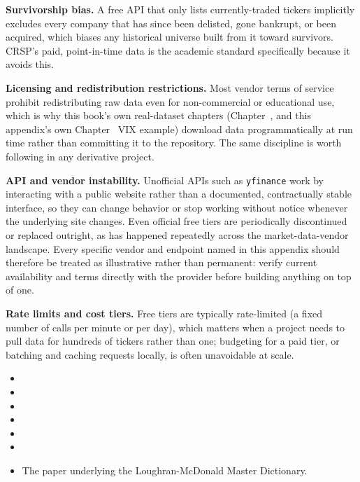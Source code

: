 \documentclass[../ai_in_finance]{subfiles}
\begin{document}
\textbf{Survivorship bias.} A free API that only lists currently-traded tickers implicitly excludes every company that has since been delisted, gone bankrupt, or been acquired, which biases any historical universe built from it toward survivors. CRSP's paid, point-in-time data is the academic standard specifically because it avoids this.

\textbf{Licensing and redistribution restrictions.} Most vendor terms of service prohibit redistributing raw data even for non-commercial or educational use, which is why this book's own real-dataset chapters (Chapter~, and this appendix's own Chapter~ VIX example) download data programmatically at run time rather than committing it to the repository. The same discipline is worth following in any derivative project.

\textbf{API and vendor instability.} Unofficial APIs such as \texttt{yfinance} work by interacting with a public website rather than a documented, contractually stable interface, so they can change behavior or stop working without notice whenever the underlying site changes. Even official free tiers are periodically discontinued or replaced outright, as has happened repeatedly across the market-data-vendor landscape. Every specific vendor and endpoint named in this appendix should therefore be treated as illustrative rather than permanent: verify current availability and terms directly with the provider before building anything on top of one.

\textbf{Rate limits and cost tiers.} Free tiers are typically rate-limited (a fixed number of calls per minute or per day), which matters when a project needs to pull data for hundreds of tickers rather than one; budgeting for a paid tier, or batching and caching requests locally, is often unavoidable at scale.


\begin{itemize}
\item {}
\item {}
\item {}
\item {}
\item {}
\item {}
\item {} The paper underlying the Loughran-McDonald Master Dictionary.
\end{itemize}
\end{document}
